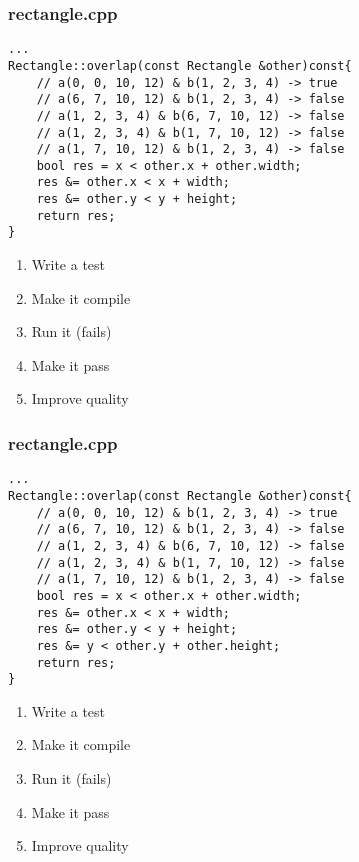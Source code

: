 \begin{frame}[fragile]
\frametitle{rectangle.cpp}
\begin{minipage}[t]{0.48\linewidth}
\begin{lstlisting}
...
Rectangle::overlap(const Rectangle &other)const{
    // a(0, 0, 10, 12) & b(1, 2, 3, 4) -> true
    // a(6, 7, 10, 12) & b(1, 2, 3, 4) -> false
    // a(1, 2, 3, 4) & b(6, 7, 10, 12) -> false
    // a(1, 2, 3, 4) & b(1, 7, 10, 12) -> false
    // a(1, 7, 10, 12) & b(1, 2, 3, 4) -> false
    bool res = x < other.x + other.width;
    res &= other.x < x + width;
    res &= other.y < y + height;
    return res;
}
\end{lstlisting}
\end{minipage}\hfill
\begin{minipage}[t]{0.28\linewidth}
  \small
  \begin{enumerate} 
    \item \textcolor{deadcolor}{Write a test}
    \item \textcolor{deadcolor}{Make it compile}
    \item \textcolor{deadcolor}{Run it (fails)}
    \item \textcolor{activecolor}{Make it pass}
    \item \textcolor{deadcolor}{Improve quality}
  \end{enumerate} 
\end{minipage}
\end{frame}



\begin{frame}[fragile]
\frametitle{rectangle.cpp}
\begin{minipage}[t]{0.48\linewidth}
\begin{lstlisting}
...
Rectangle::overlap(const Rectangle &other)const{
    // a(0, 0, 10, 12) & b(1, 2, 3, 4) -> true
    // a(6, 7, 10, 12) & b(1, 2, 3, 4) -> false
    // a(1, 2, 3, 4) & b(6, 7, 10, 12) -> false
    // a(1, 2, 3, 4) & b(1, 7, 10, 12) -> false
    // a(1, 7, 10, 12) & b(1, 2, 3, 4) -> false
    bool res = x < other.x + other.width;
    res &= other.x < x + width;
    res &= other.y < y + height;
    res &= y < other.y + other.height;
    return res;
}
\end{lstlisting}
\end{minipage}\hfill
\begin{minipage}[t]{0.28\linewidth}
  \small
  \begin{enumerate} 
    \item \textcolor{deadcolor}{Write a test}
    \item \textcolor{deadcolor}{Make it compile}
    \item \textcolor{deadcolor}{Run it (fails)}
    \item \textcolor{activecolor}{Make it pass}
    \item \textcolor{deadcolor}{Improve quality}
  \end{enumerate} 
\end{minipage}
\end{frame}



